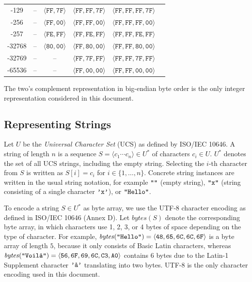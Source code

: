 \documentclass[bibtotoc,halfparskip,oneside]{scrreprt}
\newcommand{\hex}[1]{\ensuremath{\mathtt{#1}}}
\newcommand{\str}[1]{\ensuremath{\text{\texttt{"#1"}}}}
\newcommand{\chr}[1]{\ensuremath{\text{\texttt{'#1'}}}}
\begin{document}
\begin{center}
\begin{tabular}{c|ccccc}
			-129   & -- & $\langle\hex{FF},\hex{7F}\rangle$ & $\langle\hex{FF},\hex{FF},\hex{7F}\rangle$ & $\langle\hex{FF},\hex{FF},\hex{FF},\hex{7F}\rangle$\\
			-256   & -- & $\langle\hex{FF},\hex{00}\rangle$ & $\langle\hex{FF},\hex{FF},\hex{00}\rangle$ & $\langle\hex{FF},\hex{FF},\hex{FF},\hex{00}\rangle$\\
			-257   & -- & $\langle\hex{FE},\hex{FF}\rangle$ & $\langle\hex{FF},\hex{FE},\hex{FF}\rangle$ & $\langle\hex{FF},\hex{FF},\hex{FE},\hex{FF}\rangle$\\
			-32768 & -- & $\langle\hex{80},\hex{00}\rangle$ & $\langle\hex{FF},\hex{80},\hex{00}\rangle$ & $\langle\hex{FF},\hex{FF},\hex{80},\hex{00}\rangle$\\
			-32769 & -- & -- & $\langle\hex{FF},\hex{7F},\hex{FF}\rangle$ & $\langle\hex{FF},\hex{FF},\hex{7F},\hex{FF}\rangle$\\
			-65536 & -- & -- & $\langle\hex{FF},\hex{00},\hex{00}\rangle$ & $\langle\hex{FF},\hex{FF},\hex{00},\hex{00}\rangle$\\
		\end{tabular} 
	\end{center}
	The two's complement representation in big-endian byte order is the only integer representation considered in this document. 
	
	\subsection{Representing Strings}
	
	Let $U$ be the \emph{Universal Character Set} (UCS) as defined by ISO/IEC 10646. A string of length $n$ is a sequence $S=\langle c_1\cdots c_{n}\rangle\in U^*$ of characters $c_i\in U$. $U^*$ denotes the set of all UCS strings, including the empty string. Selecting the $i$-th character from $S$ is written as $S[i]=c_i$ for $i\in\{1,\ldots,n\}$. Concrete string instances are written in the usual string notation, for example $\str{}$ (empty string), $\str{x}$ (string consisting of a single character $\chr{x}$), or $\str{Hello}$.
	
	To encode a string $S\in U^*$ as byte array, we use the UTF-8 character encoding as defined in ISO/IEC 10646 (Annex D). Let $\mathit{bytes}(S)$ denote the corresponding byte array, in which characters use 1, 2, 3, or 4 bytes of space depending on the type of character. For example, $\mathit{bytes}(\str{Hello})=\langle\hex{48},\hex{65},\hex{6C},\hex{6C},\hex{6F}\rangle$ is a byte array of length $5$, because it only consists of Basic Latin characters, whereas $\mathit{bytes}(\str{Voilà})=\langle\hex{56},\hex{6F},\hex{69},\hex{6C},\hex{C3},\hex{A0}\rangle$ contains $6$ bytes due to the Latin-1 Supplement character $\chr{à}$ translating into two bytes. UTF-8 is the only character encoding used in this document.
	
\end{document}
